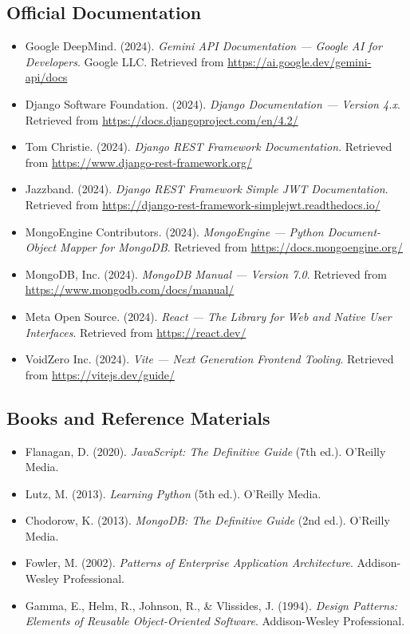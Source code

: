 \documentclass[12pt,a4paper]{article}
\begin{document}
\subsection{Official Documentation}
\begin{itemize}
    \item[{[1]}] Google DeepMind. (2024). \textit{Gemini API Documentation --- Google AI for Developers}. Google LLC. Retrieved from \url{https://ai.google.dev/gemini-api/docs}
    \item[{[2]}] Django Software Foundation. (2024). \textit{Django Documentation --- Version 4.x}. Retrieved from \url{https://docs.djangoproject.com/en/4.2/}
    \item[{[3]}] Tom Christie. (2024). \textit{Django REST Framework Documentation}. Retrieved from \url{https://www.django-rest-framework.org/}
    \item[{[4]}] Jazzband. (2024). \textit{Django REST Framework Simple JWT Documentation}. Retrieved from \url{https://django-rest-framework-simplejwt.readthedocs.io/}
    \item[{[5]}] MongoEngine Contributors. (2024). \textit{MongoEngine --- Python Document-Object Mapper for MongoDB}. Retrieved from \url{https://docs.mongoengine.org/}
    \item[{[6]}] MongoDB, Inc. (2024). \textit{MongoDB Manual --- Version 7.0}. Retrieved from \url{https://www.mongodb.com/docs/manual/}
    \item[{[7]}] Meta Open Source. (2024). \textit{React --- The Library for Web and Native User Interfaces}. Retrieved from \url{https://react.dev/}
    \item[{[8]}] VoidZero Inc. (2024). \textit{Vite --- Next Generation Frontend Tooling}. Retrieved from \url{https://vitejs.dev/guide/}
\end{itemize}

\subsection{Books and Reference Materials}
\begin{itemize}
    \item[{[9]}] Flanagan, D. (2020). \textit{JavaScript: The Definitive Guide} (7th ed.). O'Reilly Media.
    \item[{[10]}] Lutz, M. (2013). \textit{Learning Python} (5th ed.). O'Reilly Media.
    \item[{[11]}] Chodorow, K. (2013). \textit{MongoDB: The Definitive Guide} (2nd ed.). O'Reilly Media.
    \item[{[12]}] Fowler, M. (2002). \textit{Patterns of Enterprise Application Architecture}. Addison-Wesley Professional.
    \item[{[13]}] Gamma, E., Helm, R., Johnson, R., & Vlissides, J. (1994). \textit{Design Patterns: Elements of Reusable Object-Oriented Software}. Addison-Wesley Professional.
\end{itemize}
\end{document}
